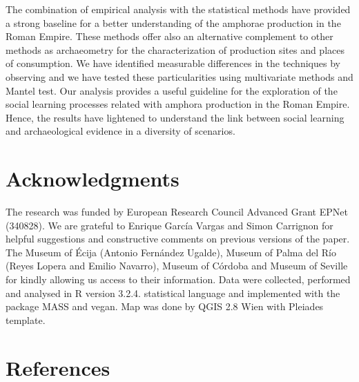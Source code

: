 \documentclass[review]{elsarticle}
\begin{document}
The combination of empirical analysis with the statistical methods have provided a strong baseline for a better understanding of the amphorae production in the Roman Empire. These methods offer also an alternative complement to other methods as archaeometry for the characterization of production sites and places of consumption. We have identified measurable differences in the techniques by observing and we have tested these particularities using multivariate methods and Mantel test. Our analysis provides a useful guideline for the exploration of the social learning processes related with amphora production in the Roman Empire. Hence, the results have lightened to understand the link between social learning and archaeological evidence in a diversity of scenarios. 

\section{Acknowledgments}

The research was funded by European Research Council Advanced Grant EPNet (340828). We are grateful to Enrique Garc\'ia Vargas and Simon Carrignon for helpful suggestions and constructive comments on previous versions of the paper. The Museum of \'Ecija (Antonio Fern\'andez Ugalde), Museum of Palma del R\'io (Reyes Lopera and Emilio Navarro), Museum of C\'ordoba and Museum of Seville for kindly allowing us access to their information.  
Data were collected, performed and analysed in R version 3.2.4. statistical language and implemented with the package MASS and vegan. Map was done by QGIS 2.8 Wien with Pleiades template. 



\section*{References}

%

\end{document}
